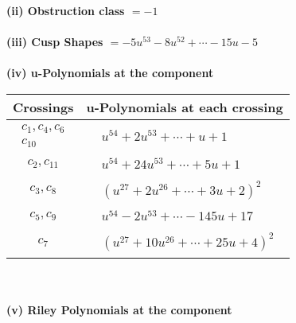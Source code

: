 \documentclass[1p]{elsarticle_modified}
\theoremstyle{definition}
\begin{document}
\flushleft \textbf{(ii) Obstruction class $= -1$}\\~\\
\flushleft \textbf{(iii) Cusp Shapes $= -5 u^{53}-8 u^{52}+\cdots-15 u-5$}\\~\\
\newpage\renewcommand{\arraystretch}{1}
\flushleft \textbf{(iv) u-Polynomials at the component}\newline \\
\begin{tabular}{m{50pt}|m{274pt}}
Crossings & \hspace{64pt}u-Polynomials at each crossing \\
\hline $$\begin{aligned}c_{1},c_{4},c_{6}\\c_{10}\end{aligned}$$&$\begin{aligned}
&u^{54}+2 u^{53}+\cdots+u+1
\end{aligned}$\\
\hline $$\begin{aligned}c_{2},c_{11}\end{aligned}$$&$\begin{aligned}
&u^{54}+24 u^{53}+\cdots+5 u+1
\end{aligned}$\\
\hline $$\begin{aligned}c_{3},c_{8}\end{aligned}$$&$\begin{aligned}
&(u^{27}+2 u^{26}+\cdots+3 u+2)^{2}
\end{aligned}$\\
\hline $$\begin{aligned}c_{5},c_{9}\end{aligned}$$&$\begin{aligned}
&u^{54}-2 u^{53}+\cdots-145 u+17
\end{aligned}$\\
\hline $$\begin{aligned}c_{7}\end{aligned}$$&$\begin{aligned}
&(u^{27}+10 u^{26}+\cdots+25 u+4)^{2}
\end{aligned}$\\
\hline
\end{tabular}\\~\\
\newpage\renewcommand{\arraystretch}{1}
\flushleft \textbf{(v) Riley Polynomials at the component}\newline \\
\end{document}
